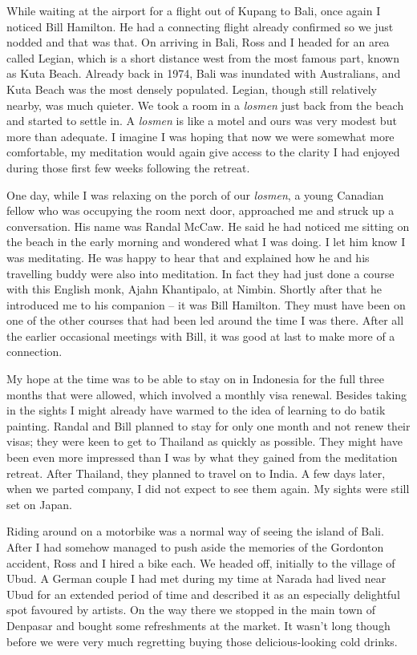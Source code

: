 \enlargethispage{\baselineskip}

While waiting at the airport for a flight out of Kupang to Bali, once
again I noticed Bill Hamilton. He had a connecting flight already
confirmed so we just nodded and that was that. On arriving in Bali, Ross
and I headed for an area called Legian, which is a short distance west
from the most famous part, known as Kuta Beach. Already back in 1974,
Bali was inundated with Australians, and Kuta Beach was the most densely
populated. Legian, though still relatively nearby, was much quieter. We
took a room in a \emph{losmen} just back from the beach and started to
settle in. A \emph{losmen} is like a motel and ours was very modest but
more than adequate. I imagine I was hoping that now we were somewhat
more comfortable, my meditation would again give access to the clarity I
had enjoyed during those first few weeks following the retreat.

One day, while I was relaxing on the porch of our \emph{losmen}, a young
Canadian fellow who was occupying the room next door, approached me and
struck up a conversation. His name was Randal McCaw. He said he had
noticed me sitting on the beach in the early morning and wondered what I
was doing. I let him know I was meditating. He was happy to hear that
and explained how he and his travelling buddy were also into meditation.
In fact they had just done a course with this English monk, Ajahn
Khantipalo, at Nimbin. Shortly after that he introduced me to his
companion -- it was Bill Hamilton. They must have been on one of the
other courses that had been led around the time I was there. After all
the earlier occasional meetings with Bill, it was good at last to make
more of a connection.

\enlargethispage{\baselineskip}

My hope at the time was to be able to stay on in Indonesia for the full
three months that were allowed, which involved a monthly visa renewal.
Besides taking in the sights I might already have warmed to the idea of
learning to do batik painting. Randal and Bill planned to stay for only
one month and not renew their visas; they were keen to get to Thailand
as quickly as possible. They might have been even more impressed than I
was by what they gained from the meditation retreat. After Thailand,
they planned to travel on to India. A few days later, when we parted
company, I did not expect to see them again. My sights were still set on
Japan.

Riding around on a motorbike was a normal way of seeing the island of
Bali. After I had somehow managed to push aside the memories of the
Gordonton accident, Ross and I hired a bike each. We headed off,
initially to the village of Ubud. A German couple I had met during my time at Narada
had lived near Ubud for an extended period of time and described it as
an especially delightful spot favoured by artists. On the way there we
stopped in the main town of Denpasar and bought some refreshments at the
market. It wasn't long though before we were very much regretting buying
those delicious-looking cold drinks.

